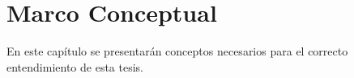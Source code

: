 \chapter{Marco Conceptual}
\label{cap:marcoteorico}


En este capítulo se presentarán conceptos necesarios para el correcto 
entendimiento de esta tesis.





